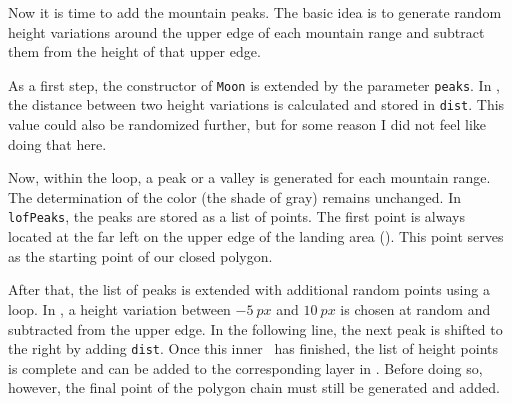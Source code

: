 

Now it is time to add the mountain peaks. The basic idea is to generate random height variations around the upper edge of each mountain range and subtract them from the height of that upper edge.

As a first step, the constructor of \texttt{Moon} is extended by the parameter \texttt{peaks}. In , the distance between two height variations is calculated and stored in \texttt{dist}. This value could also be randomized further, but for some reason I did not feel like doing that here.

\begin{figure}%
	\begin{center}%
		\vspace{-1cm}%
	\end{center}%
\end{figure}%
Now, within the loop, a peak or a valley is generated for each mountain range. The determination of the color (the shade of gray) remains unchanged. In \texttt{lofPeaks}, the peaks are stored as a list of points. The first point is always located at the far left on the upper edge of the landing area (). This point serves as the starting point of our closed polygon.

After that, the list of peaks is extended with additional random points using a loop. In , a height variation between $\SI{-5}{px}$ and $\SI{10}{px}$ is chosen at random and subtracted from the upper edge. In the following line, the next peak is shifted to the right by adding \texttt{dist}. Once this inner \forSchleife\ has finished, the list of height points is complete and can be added to the corresponding layer in . Before doing so, however, the final point of the polygon chain must still be generated and added.


